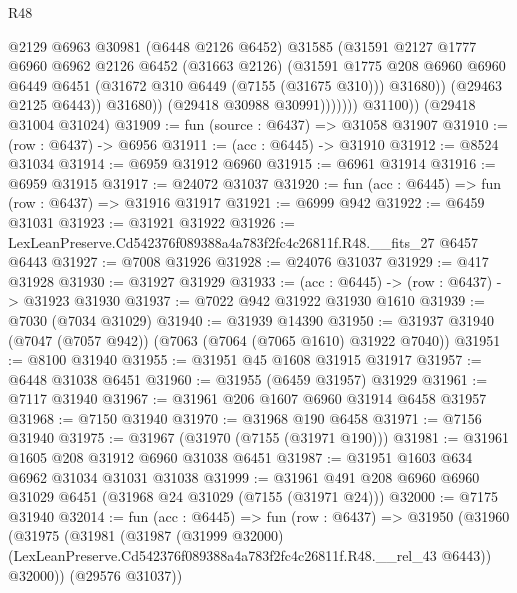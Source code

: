\begin{lexlean}{R48}
\begin{coremodule}
                          @2129
                          @6963
                          @30981
                          (@6448 @2126 @6452)
                          @31585
                          (@31591
                            @2127
                            @1777
                            @6960
                            @6962
                            @2126
                            @6452
                            (@31663 @2126)
                            (@31591
                              @1775
                              @208
                              @6960
                              @6960
                              @6449
                              @6451
                              (@31672 @310 @6449 (@7155 (@31675 @310)))
                              @31680))
                          (@29463 @2125 @6443))
                        @31680))
                    (@29418 @30988 @30991)))))))
        @31100))
    (@29418 @31004 @31024)
@31909 := fun (source : @6437) => @31058 @31907
@31910 := (row : @6437) -> @6956
@31911 := (acc : @6445) -> @31910
@31912 := @8524 @31034
@31914 := @6959 @31912 @6960
@31915 := @6961 @31914
@31916 := @6959 @31915
@31917 := @24072 @31037
@31920 := fun (acc : @6445) => fun (row : @6437) => @31916 @31917
@31921 := @6999 @942
@31922 := @6459 @31031
@31923 := @31921 @31922
@31926 := LexLeanPreserve.Cd542376f089388a4a783f2fc4c26811f.R48.__fits_27 @6457 @6443
@31927 := @7008 @31926
@31928 := @24076 @31037
@31929 := @417 @31928
@31930 := @31927 @31929
@31933 := (acc : @6445) -> (row : @6437) -> @31923 @31930
@31937 := @7022 @942 @31922 @31930 @1610
@31939 := @7030 (@7034 @31029)
@31940 := @31939 @14390
@31950 := @31937 @31940 (@7047 (@7057 @942)) (@7063 (@7064 (@7065 @1610) @31922 @7040))
@31951 := @8100 @31940
@31955 := @31951 @45 @1608 @31915 @31917
@31957 := @6448 @31038 @6451
@31960 := @31955 (@6459 @31957) @31929
@31961 := @7117 @31940
@31967 := @31961 @206 @1607 @6960 @31914 @6458 @31957
@31968 := @7150 @31940
@31970 := @31968 @190 @6458
@31971 := @7156 @31940
@31975 := @31967 (@31970 (@7155 (@31971 @190)))
@31981 := @31961 @1605 @208 @31912 @6960 @31038 @6451
@31987 := @31951 @1603 @634 @6962 @31034 @31031 @31038
@31999 := @31961 @491 @208 @6960 @6960 @31029 @6451 (@31968 @24 @31029 (@7155 (@31971 @24)))
@32000 := @7175 @31940
@32014 := fun (acc : @6445) =>
  fun (row : @6437) =>
  @31950
    (@31960
      (@31975
        (@31981
          (@31987
            (@31999 @32000)
            (LexLeanPreserve.Cd542376f089388a4a783f2fc4c26811f.R48.__rel_43 @6443))
          @32000))
      (@29576 @31037))

\end{coremodule}
\end{lexlean}
